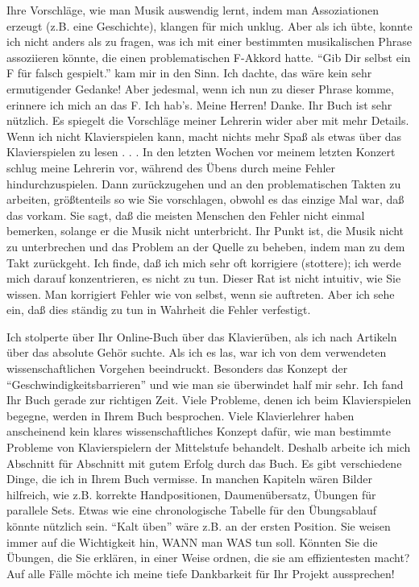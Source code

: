 \item \hypertarget{testimonials21}{}
Ihre Vorschläge, wie man Musik auswendig lernt, indem man Assoziationen erzeugt (z.B. eine Geschichte), klangen für mich unklug.
Aber als ich übte, konnte ich nicht anders als zu fragen, was ich mit einer bestimmten musikalischen Phrase assoziieren könnte, die einen problematischen F-Akkord hatte.
\enquote{Gib Dir selbst ein F für falsch gespielt.} kam mir in den Sinn.
Ich dachte, das wäre kein sehr ermutigender Gedanke!
Aber jedesmal, wenn ich nun zu dieser Phrase komme, erinnere ich mich an das F.
Ich hab's. Meine Herren! Danke. Ihr Buch ist sehr nützlich.
Es spiegelt die Vorschläge meiner Lehrerin wider aber mit mehr Details.
Wenn ich nicht Klavierspielen kann, macht nichts mehr Spaß als etwas über das Klavierspielen zu lesen . . .
In den letzten Wochen vor meinem letzten Konzert schlug meine Lehrerin vor, während des Übens durch meine Fehler hindurchzuspielen.
Dann zurückzugehen und an den problematischen Takten zu arbeiten, größtenteils so wie Sie vorschlagen, obwohl es das einzige Mal war, daß das vorkam.
Sie sagt, daß die meisten Menschen den Fehler nicht einmal bemerken, solange er die Musik nicht unterbricht.
Ihr Punkt ist, die Musik nicht zu unterbrechen und das Problem an der Quelle zu beheben, indem man zu dem Takt zurückgeht.
Ich finde, daß ich mich sehr oft korrigiere (stottere); ich werde mich darauf konzentrieren, es nicht zu tun.
Dieser Rat ist nicht intuitiv, wie Sie wissen.
Man korrigiert Fehler wie von selbst, wenn sie auftreten.
Aber ich sehe ein, daß dies ständig zu tun in Wahrheit die Fehler verfestigt.


\item \hypertarget{testimonials22}{}
Ich stolperte über Ihr Online-Buch über das Klavierüben, als ich nach Artikeln über das absolute Gehör suchte.
Als ich es las, war ich von dem verwendeten wissenschaftlichen Vorgehen beeindruckt.
Besonders das Konzept der \enquote{Geschwindigkeitsbarrieren} und wie man sie überwindet half mir sehr.
Ich fand Ihr Buch gerade zur richtigen Zeit.
Viele Probleme, denen ich beim Klavierspielen begegne, werden in Ihrem Buch besprochen.
Viele Klavierlehrer haben anscheinend kein klares wissenschaftliches Konzept dafür, wie man bestimmte Probleme von Klavierspielern der Mittelstufe behandelt.
Deshalb arbeite ich mich Abschnitt für Abschnitt mit gutem Erfolg durch das Buch.
Es gibt verschiedene Dinge, die ich in Ihrem Buch vermisse.
In manchen Kapiteln wären Bilder hilfreich, wie z.B. korrekte Handpositionen, Daumenübersatz, Übungen für parallele Sets.
Etwas wie eine chronologische Tabelle für den Übungsablauf könnte nützlich sein.
\enquote{Kalt üben} wäre z.B. an der ersten Position.
Sie weisen immer auf die Wichtigkeit hin, WANN man WAS tun soll.
Könnten Sie die Übungen, die Sie erklären, in einer Weise ordnen, die sie am effizientesten macht?
Auf alle Fälle möchte ich meine tiefe Dankbarkeit für Ihr Projekt aussprechen!


